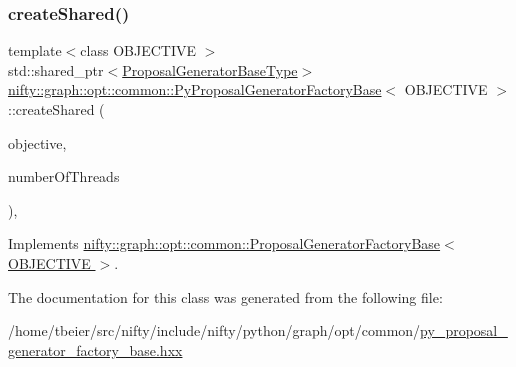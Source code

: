 \subsubsection{\texorpdfstring{create\+Shared()}{createShared()}}
{\footnotesize\ttfamily template$<$class O\+B\+J\+E\+C\+T\+I\+VE $>$ \\
std\+::shared\+\_\+ptr$<$\hyperlink{classnifty_1_1graph_1_1opt_1_1common_1_1ProposalGeneratorFactoryBase_a262cfc7056a43871e15130dd4435dee7}{Proposal\+Generator\+Base\+Type}$>$ \hyperlink{classnifty_1_1graph_1_1opt_1_1common_1_1PyProposalGeneratorFactoryBase}{nifty\+::graph\+::opt\+::common\+::\+Py\+Proposal\+Generator\+Factory\+Base}$<$ O\+B\+J\+E\+C\+T\+I\+VE $>$\+::create\+Shared (\begin{DoxyParamCaption}\item[{const \hyperlink{classnifty_1_1graph_1_1opt_1_1common_1_1ProposalGeneratorFactoryBase_abb308b47da6f89126f786b394be0efc5}{Objective\+Type} \&}]{objective,  }\item[{const size\+\_\+t}]{number\+Of\+Threads }\end{DoxyParamCaption})\hspace{0.3cm}{\ttfamily [inline]}, {\ttfamily [virtual]}}



Implements \hyperlink{classnifty_1_1graph_1_1opt_1_1common_1_1ProposalGeneratorFactoryBase_a0c4cfed6cb2b4ac7244d1a076a0ec3b7}{nifty\+::graph\+::opt\+::common\+::\+Proposal\+Generator\+Factory\+Base$<$ O\+B\+J\+E\+C\+T\+I\+V\+E $>$}.



The documentation for this class was generated from the following file\+:\begin{DoxyCompactItemize}
\item 
/home/tbeier/src/nifty/include/nifty/python/graph/opt/common/\hyperlink{common_2py__proposal__generator__factory__base_8hxx}{py\+\_\+proposal\+\_\+generator\+\_\+factory\+\_\+base.\+hxx}\end{DoxyCompactItemize}
